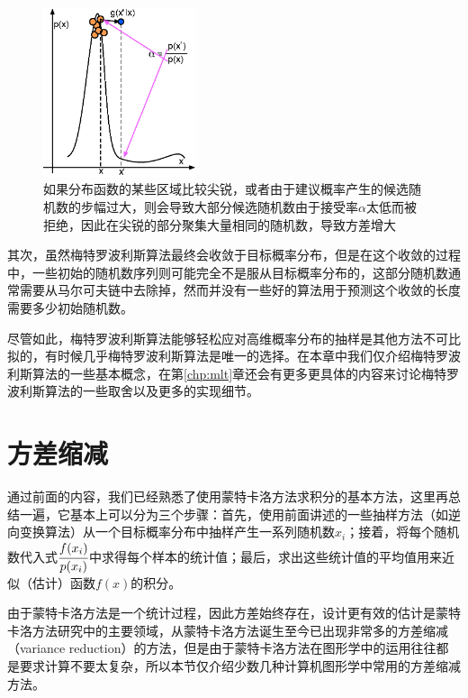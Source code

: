 \begin{figure}
	\sidecaption
	\includegraphics[width=0.4\textwidth]{figures/mc/metropolis-1}
	\caption{如果分布函数的某些区域比较尖锐，或者由于建议概率产生的候选随机数的步幅过大，则会导致大部分候选随机数由于接受率$\alpha$太低而被拒绝，因此在尖锐的部分聚集大量相同的随机数，导致方差增大}
	\label{f:mc-met-1}
\end{figure}

其次，虽然梅特罗波利斯算法最终会收敛于目标概率分布，但是在这个收敛的过程中，一些初始的随机数序列则可能完全不是服从目标概率分布的，这部分随机数通常需要从马尔可夫链中去除掉，然而并没有一些好的算法用于预测这个收敛的长度需要多少初始随机数。

尽管如此，梅特罗波利斯算法能够轻松应对高维概率分布的抽样是其他方法不可比拟的，有时候几乎梅特罗波利斯算法是唯一的选择。在本章中我们仅介绍梅特罗波利斯算法的一些基本概念，在第\ref{chp:mlt}章还会有更多更具体的内容来讨论梅特罗波利斯算法的一些取舍以及更多的实现细节。





\section{方差缩减}\label{sec:Variance-Reduction}
通过前面的内容，我们已经熟悉了使用蒙特卡洛方法求积分的基本方法，这里再总结一遍，它基本上可以分为三个步骤：首先，使用前面讲述的一些抽样方法（如逆向变换算法）从一个目标概率分布中抽样产生一系列随机数$x_i$；接着，将每个随机数代入式$ \cfrac{f(x_i)}{p(x_i)}$中求得每个样本的统计值；最后，求出这些统计值的平均值用来近似（估计）函数$f(x)$的积分。

由于蒙特卡洛方法是一个统计过程，因此方差始终存在，设计更有效的估计是蒙特卡洛方法研究中的主要领域，从蒙特卡洛方法诞生至今已出现非常多的方差缩减（variance reduction）的方法，但是由于蒙特卡洛方法在图形学中的运用往往都是要求计算不要太复杂，所以本节仅介绍少数几种计算机图形学中常用的方差缩减方法。





